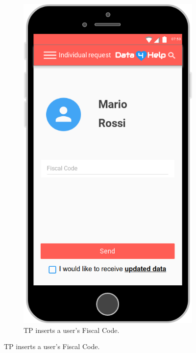 \begin{figure}[ht]
  \begin{subfigure}[t]{0.38\linewidth}
    \includegraphics[width=\linewidth]{images/Mock-up/Individual_Request_2.png}
    \caption{TP inserts a user's Fiscal Code.}
  \end{subfigure}
\end{figure}

